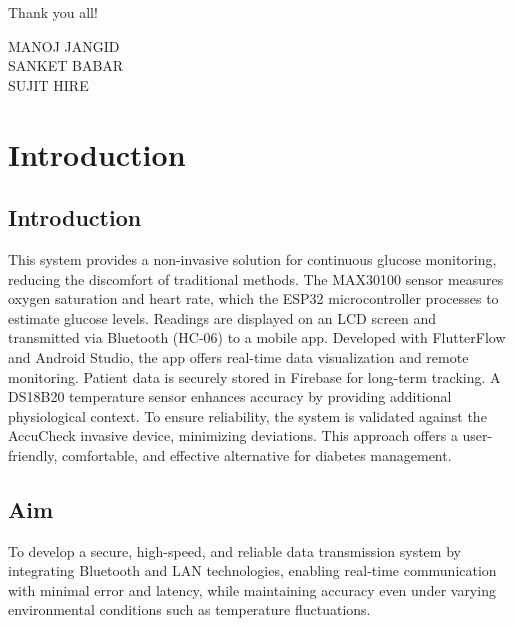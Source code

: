 \documentclass[12pt]{report}
\begin{document}
Thank you all!

\begin{flushright}
    MANOJ JANGID\\
    SANKET BABAR\\
    SUJIT HIRE
\end{flushright}
\newpage

\chapter{Introduction}
\section{Introduction}
This system provides a non-invasive solution for continuous glucose monitoring, reducing the discomfort of traditional methods. The MAX30100 sensor measures oxygen saturation and heart rate, which the ESP32 microcontroller processes to estimate glucose levels. Readings are displayed on an LCD screen and transmitted via Bluetooth (HC-06) to a mobile app. Developed with FlutterFlow and Android Studio, the app offers real-time data visualization and remote monitoring. Patient data is securely stored in Firebase for long-term tracking. A DS18B20 temperature sensor enhances accuracy by providing additional physiological context. To ensure reliability, the system is validated against the AccuCheck invasive device, minimizing deviations. This approach offers a user-friendly, comfortable, and effective alternative for diabetes management.

\section{Aim}
To develop a secure, high-speed, and reliable data transmission system by integrating Bluetooth and LAN technologies, enabling real-time communication with minimal error and latency, while maintaining accuracy even under varying environmental conditions such as temperature fluctuations.
\end{document}
